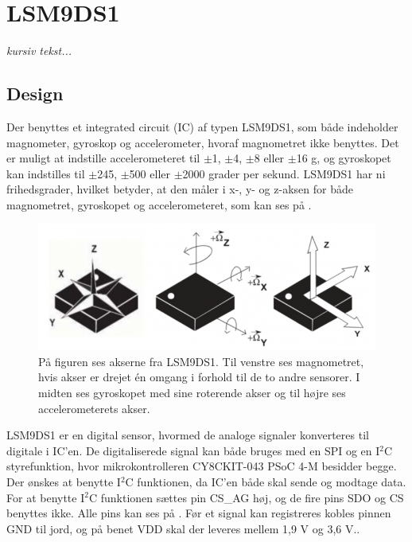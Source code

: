 \section{LSM9DS1}\label{sec_design_LSM9DS1}
\textit{kursiv tekst...}
\subsection{Design}
Der benyttes et integrated circuit (IC) af typen LSM9DS1, som både indeholder magnometer, gyroskop og accelerometer, hvoraf magnometret ikke benyttes. Det er muligt at indstille accelerometeret til $\pm$1, $\pm$4, $\pm$8 eller $\pm$16 g, og gyroskopet kan indstilles til $\pm$245, $\pm$500 eller $\pm$2000 grader per sekund. \citep{Jimb02016} \newline
LSM9DS1 har ni frihedsgrader, hvilket betyder, at den måler i x-, y- og z-aksen for både magnometret, gyroskopet og accelerometeret, som kan ses på . %
\citep{Jimb02016}\newline 
\begin{figure}[H]
	\centering
	\includegraphics[scale=0.6]{figures/cDesign/LSM9DS1.png}
	\caption{På figuren ses akserne fra LSM9DS1. Til venstre ses magnometret, hvis akser er drejet én omgang i forhold til de to andre sensorer. I midten ses gyroskopet med sine roterende akser og til højre ses accelerometerets akser.\citep{Jimb02016}}
	\label{vores_IC}
\end{figure}
LSM9DS1 er en digital sensor, hvormed de analoge signaler konverteres til digitale i IC'en. De digitaliserede signal kan både bruges med en SPI og en I$^{2}$C styrefunktion, hvor mikrokontrolleren CY8CKIT-043 PSoC 4-M besidder begge. Der ønskes at benytte I$^{2}$C funktionen, da IC'en både skal sende og modtage data. For at benytte I$^{2}$C funktionen sættes pin CS\_AG høj, og de fire pins SDO og CS benyttes ikke. Alle pins kan ses på . Før et signal kan registreres kobles pinnen GND til jord, og på benet VDD skal der leveres mellem 1,9 V og 3,6 V.. 
